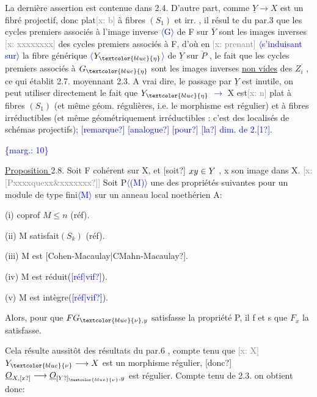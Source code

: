 \documentclass[11pt]{article}
\newcommand{\scanpage}[1]{\par\bigskip\noindent{\small\sffamily[scan #1]}\par}
\newcommand{\mspage}[1]{{\small\sffamily[p.\,#1]}}
\newcommand{\hand}[1]{\textcolor{blue}{#1}}
\let\over\relax
\newcommand{\over}[2]{\textcolor{gray}{#1}\textcolor{blue}{\ensuremath{^{\!\nearrow}}#2}}
\newcommand{\inserted}[2][]{\textcolor{blue}{$\langle$#2$\rangle$}}
\newcommand{\margin}[1]{\textcolor{blue}{\{\textsf{marg.:} #1\}}}
\newcommand{\xout}[1]{\textcolor{gray}{[\textsf{x:} #1]}}
\newcommand{\uline}[1]{\underline{#1}}
\newcommand{\unsure}[1]{[#1?]}
\begin{document}
La dernière assertion est contenue dans 2.4. D'autre part, comme
$\underline{Y} \rightarrow X$ est un fibré projectif, donc plat\xout{b} à fibres $(S_1)$ et irr. , il résul
te du par.3 que les cycles premiers associés à l'image inverse \inserted{G} de F sur
$\overline{Y}$ sont les images inverses \xout{xxxxxxxx} des cycles premiers associés à F,
d'où en \xout{prenant} \inserted[typed]{s'induisant sur} la fibre générique \inserted[typed]{$Y_{\hand{\eta}}$} de $\underline{Y}$ sur $\check{P}$ , le fait que les
cycles premiers associés à $G_{\hand{\eta}}$ sont les images inverses \uline{non vides} des $Z_i$ ,
ce qui établit 2.7. moyennant 2.3. A vrai dire, le passage par $\underline{Y}$ est
inutile, on peut utiliser directement le fait que $Y_{\hand{\eta}}$ \hand{$\longrightarrow$} X est\xout{n} plat à
fibres $(S_1)$ (et même géom. régulières, i.e. le morphisme est régulier)
et à fibres irréductibles (et même géométriquement irréductibles : c'est
des localisés de schémas projectifs)\hand{;} \hand{\unsure{remarque} \unsure{analogue} \unsure{pour} \unsure{la}
dim. de 2.\unsure{1}.}

\margin{10}

\clearpage
\scanpage{25/11}
\mspage{8}

\uline{Proposition }2.8.  Soit F cohérent sur X, et \unsure{soit} $\over{x}{y}\in Y$ , x son image
dans X. \xout{\unsure{Pxxxxquexx\&xxxxxxx}}  Soit P\inserted{(M)} une des propriétés suivantes pour
un module de type fini\inserted{M} sur un anneau local noethérien A:

(i)   coprof $M\leqslant n$   (réf).

(ii)  M satisfait$(S_k)$  (réf).

(iii)  M est \unsure{Cohen-Macaulay|CMahn-Macaulay}.

(iv)  M est réduit(\hand{\unsure{réf|vif}}).

(v)   M est intègre(\hand{\unsure{réf|vif}}).

Alors, pour que $\over{F}{G}_{\hand{\nu},y}$ satisfasse la propriété P, il f et s que $F_x$ la
satisfasse.

Cela résulte aussitôt des résultats du par.6 , compte tenu que
\xout{X} $Y_{\hand{\nu}}\longrightarrow X$  est un morphisme régulier, \unsure{donc}  $\underline{O}_{X,\unsure{x}}\longrightarrow \underline{O}_{\unsure{Y}_{\hand{\nu}},y}$ est
régulier.  Compte tenu de 2.3. on obtient donc:
\end{document}

